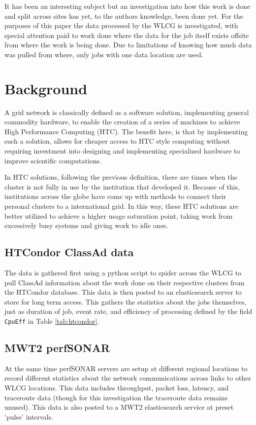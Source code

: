 \documentclass[print,ms]{nuthesis}
\begin{document}
It has been an interesting subject but an investigation into how this work is done and split across sites has yet, to the authors knowledge, been done yet. For the purposes of this paper the data processed by the WLCG is investigated, with special attention paid to work done where the data for the job itself exists offsite from where the work is being done. Due to limitations of knowing how much data was pulled from where, only jobs with one data location are used.


\chapter{Background}
A grid network is classically defined as a software solution, implementing general commodity hardware, to enable the creation of a series of machines to achieve High Performance Computing (HTC). The benefit here, is that by implementing such a solution, allows for cheaper access to HTC style computing without requiring investment into designing and implementing specialized hardware to improve scientific computations.

In HTC solutions, following the previous definition, there are times when the cluster is not fully in use by the institution that developed it. Because of this, institutions across the globe have come up with methods to connect their personal clusters to a international grid. In this way, these HTC solutions are better utilized to achieve a higher usage saturation point, taking work from excessively busy systems and giving work to idle ones.
\section{HTCondor ClassAd data} \label{sec:classad}
The data is gathered first using a python script to spider across the WLCG to pull ClassAd information about the work done on their respective clusters from the HTCondor\cite{condor} database. This data is then posted to an elasticsearch server to store for long term access. This gathers the statistics about the jobs themselves, just as duration of job, event rate, and efficiency of processing defined by the field \texttt{CpuEff} in Table \ref{tab:htcondor}.
\section{MWT2 perfSONAR}
At the same time perfSONAR servers are setup at different regional locations to record different statistics about the network communications across links to other WLCG locations. This data includes throughput, packet loss, latency, and traceroute data (though for this investigation the traceroute data remains unused). This data is also posted to a MWT2 elasticsearch service at preset 'pulse' intervals.
\end{document}
